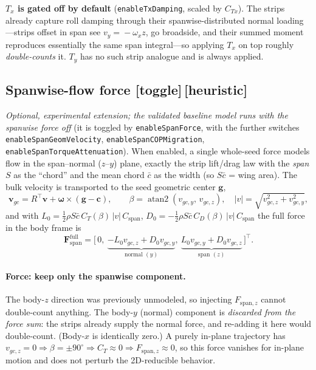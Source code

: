 \documentclass[11pt]{article}
\newcommand{\heur}{{\small\textbf{\color{teal}[heuristic]}}}     %
\newcommand{\opt}{{\small\textbf{\color{orange!80!black}[toggle]}}} %
\begin{document}
\noindent\textbf{$T_x$ is gated off by default} (\texttt{enableTxDamping}, scaled by
$C_{Tx}$). The strips already capture roll damping through their spanwise-distributed
normal loading---strips offset in span see $v_y\!=\!-\omega_x z$, go broadside, and their
summed moment reproduces essentially the same span integral---so applying $T_x$ on top
roughly \emph{double-counts} it. $T_y$ has no such strip analogue and is always applied.

\subsection*{Spanwise-flow force \opt{}\,\heur{}}
\emph{Optional, experimental extension; the validated baseline model runs with the
spanwise force off} (it is toggled by \texttt{enableSpanForce}, with the further switches
\texttt{enableSpanGeomVelocity}, \texttt{enableSpanCOPMigration},
\texttt{enableSpanTorqueAttenuation}). When enabled, a single whole-seed force models flow
in the span--normal ($z$--$y$) plane, exactly the strip lift/drag law with the \emph{span}
$S$ as the ``chord'' and the mean chord $\bar c$ as the width (so $S\bar c$ = wing area).
The bulk velocity is transported to the seed geometric center $\mathbf g$,
\[
  \mathbf v_{gc} = R^{\top}\mathbf v + \boldsymbol\omega\times(\mathbf g-\mathbf c),
  \qquad
  \beta = \operatorname{atan2}(v_{gc,y},\,v_{gc,z}),\quad
  |v| = \sqrt{v_{gc,z}^2+v_{gc,y}^2},
\]
and with $L_0=\tfrac12\rho S\bar c\,C_T(\beta)\,|v|\,C_{\text{span}}$,
$D_0=-\tfrac12\rho S\bar c\,C_D(\beta)\,|v|\,C_{\text{span}}$ the full force in the body
frame is
\[
  \mathbf F_{\text{span}}^{\text{full}} =
  \big[\,0,\ \underbrace{-L_0 v_{gc,z}+D_0 v_{gc,y}}_{\text{normal }(y)},\
        \underbrace{L_0 v_{gc,y}+D_0 v_{gc,z}}_{\text{span }(z)}\,\big]^{\top}.
\]

\paragraph{Force: keep only the spanwise component.} The body-$z$ direction was
previously unmodeled, so injecting $F_{\text{span},z}$ cannot double-count anything. The
body-$y$ (normal) component is \emph{discarded from the force sum}: the strips already
supply the normal force, and re-adding it here would double-count. (Body-$x$ is
identically zero.) A purely in-plane trajectory has $v_{gc,z}=0\Rightarrow\beta=\pm90^\circ
\Rightarrow C_T\approx0\Rightarrow F_{\text{span},z}\approx0$, so this force vanishes for
in-plane motion and does not perturb the 2D-reducible behavior.
\end{document}
